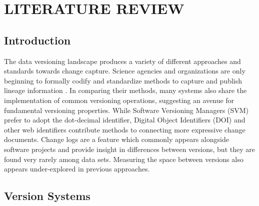 
\chapter{LITERATURE REVIEW}\label{ch:prevwork}

\section{Introduction}

The data versioning landscape produces a variety of different approaches and standards towards change capture.
Science agencies and organizations are only beginning to formally codify and standardize methods to capture and publish lineage information \cite{MatthewS.Mayernik201312-039}.
In comparing their methods, many systems also share the implementation of common versioning operations, suggesting an avenue for fundamental versioning properties.
While Software Versioning Managers (SVM) prefer to adopt the dot-decimal identifier, Digital Object Identifiers (DOI) and other web identifiers contribute methods to connecting more expressive change documents.
Change logs are a feature which commonly appears alongside software projects and provide insight in differences between versions, but they are found very rarely among data sets.
Measuring the space between versions also appears under-explored in previous approaches.

\section{Version Systems} \label{sec:system}

